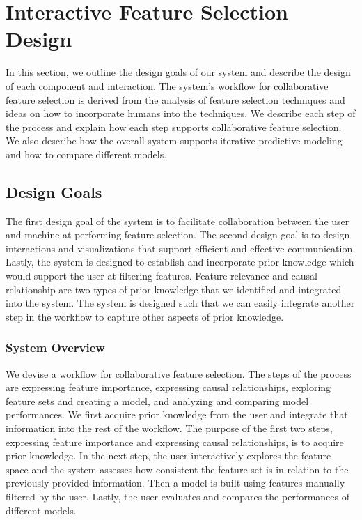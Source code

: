 \chapter{Interactive Feature Selection Design}
In this section, we outline the design goals of our system and describe the design of each component and interaction. The system's workflow for collaborative feature selection is derived from the analysis of feature selection techniques and ideas on how to incorporate humans into the techniques. We describe each step of the process and explain how each step supports collaborative feature selection. We also describe how the overall system supports iterative predictive modeling and how to compare different models.

\section{Design Goals}
The first design goal of the system is to facilitate collaboration between the user and machine at performing feature selection. The second design goal is to design interactions and visualizations that support efficient and effective communication. Lastly, the system is designed to establish and incorporate prior knowledge which would support the user at filtering features. Feature relevance and causal relationship are two types of prior knowledge that we identified and integrated into the system. The system is designed such that we can easily integrate another step in the workflow to capture other aspects of prior knowledge. 

\subsection{System Overview}
We devise a workflow for collaborative feature selection. The steps of the process are expressing feature importance, expressing causal relationships, exploring feature sets and creating a model, and analyzing and comparing model performances. We first acquire prior knowledge from the user and integrate that information into the rest of the workflow. The purpose of the first two steps, expressing feature importance and expressing causal relationships, is to acquire prior knowledge. In the next step, the user interactively explores the feature space and the system assesses how consistent the feature set is in relation to the previously provided information. Then a model is built using features manually filtered by the user. Lastly, the user evaluates and compares the performances of different models.

